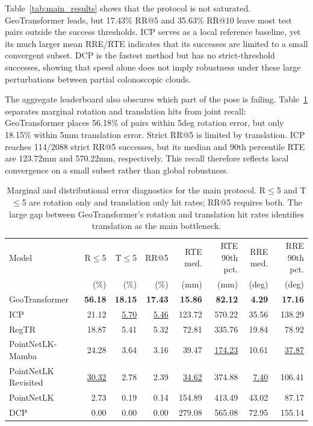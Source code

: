 \documentclass{bmvc2k}
\newcommand{\best}[1]{\textbf{#1}}
\newcommand{\second}[1]{\underline{#1}}
\begin{document}
Table~\ref{tab:main_results} shows that the protocol is not saturated. GeoTransformer leads, but 17.43\% RR@5 and 35.63\% RR@10 leave most test pairs outside the success thresholds. ICP serves as a local reference baseline, yet its much larger mean RRE/RTE indicates that its successes are limited to a small convergent subset. DCP is the fastest method but has no strict-threshold successes, showing that speed alone does not imply robustness under these large perturbations between partial colonoscopic clouds.

The aggregate leaderboard also obscures which part of the pose is failing. Table~\ref{tab:error_distribution} separates marginal rotation and translation hits from joint recall: GeoTransformer places 56.18\% of pairs within 5deg rotation error, but only 18.15\% within 5mm translation error. Strict RR@5 is limited by translation. ICP reaches 114/2088 strict RR@5 successes, but its median and 90th percentile RTE are 123.72mm and 570.22mm, respectively. This recall therefore reflects local convergence on a small subset rather than global robustness.

\begin{table}[!htbp]
\centering
\caption{Marginal and distributional error diagnostics for the main protocol. R$\leq$5 and T$\leq$5 are rotation only and translation only hit rates; RR@5 requires both. The large gap between GeoTransformer's rotation and translation hit rates identifies translation as the main bottleneck.}
\label{tab:error_distribution}
\scriptsize
\setlength{\tabcolsep}{3.4pt}
\begin{tabular}{lrrrrrrr}
\hline
Model & R$\leq$5 & T$\leq$5 & RR@5 & RTE med. & RTE 90th pct. & RRE med. & RRE 90th pct. \\
 & (\%) & (\%) & (\%) & (mm) & (mm) & (deg) & (deg) \\
\hline
GeoTransformer~\cite{qin2022geometric} & \best{56.18} & \best{18.15} & \best{17.43} & \best{15.86} & \best{82.12} & \best{4.29} & \best{17.16} \\
ICP~\cite{besl1992method} & 21.12 & \second{5.70} & \second{5.46} & 123.72 & 570.22 & 35.56 & 138.29 \\
RegTR~\cite{yew2022regtr} & 18.87 & 5.41 & 5.32 & 72.81 & 335.76 & 19.84 & 78.92 \\
PointNetLK-Mamba & 24.28 & 3.64 & 3.16 & 39.47 & \second{174.23} & 10.61 & \second{37.87} \\
PointNetLK Revisited~\cite{li2021pointnetlk} & \second{30.32} & 2.78 & 2.39 & \second{34.62} & 374.88 & \second{7.40} & 106.41 \\
PointNetLK~\cite{aoki2019pointnetlk} & 2.73 & 0.19 & 0.14 & 154.89 & 413.49 & 43.02 & 87.17 \\
DCP~\cite{wang2019deep} & 0.00 & 0.00 & 0.00 & 279.08 & 565.08 & 72.95 & 155.14 \\
\hline
\end{tabular}
\end{table}
\end{document}
